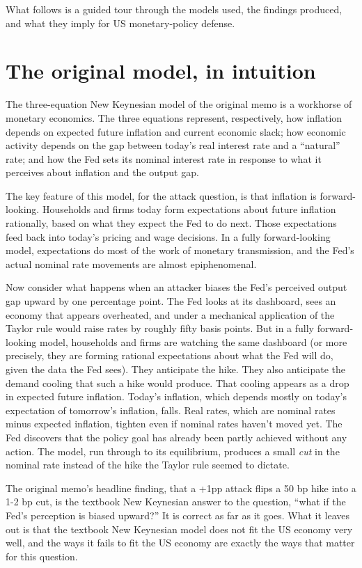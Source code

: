 \documentclass[12pt]{article}
\begin{document}
What follows is a guided tour through the models used, the findings produced, and what they imply for US monetary-policy defense.

\section{The original model, in intuition}

The three-equation New Keynesian model of the original memo is a workhorse of monetary economics. The three equations represent, respectively, how inflation depends on expected future inflation and current economic slack; how economic activity depends on the gap between today's real interest rate and a ``natural'' rate; and how the Fed sets its nominal interest rate in response to what it perceives about inflation and the output gap.

The key feature of this model, for the attack question, is that inflation is forward-looking. Households and firms today form expectations about future inflation rationally, based on what they expect the Fed to do next. Those expectations feed back into today's pricing and wage decisions. In a fully forward-looking model, expectations do most of the work of monetary transmission, and the Fed's actual nominal rate movements are almost epiphenomenal.

Now consider what happens when an attacker biases the Fed's perceived output gap upward by one percentage point. The Fed looks at its dashboard, sees an economy that appears overheated, and under a mechanical application of the Taylor rule would raise rates by roughly fifty basis points. But in a fully forward-looking model, households and firms are watching the same dashboard (or more precisely, they are forming rational expectations about what the Fed will do, given the data the Fed sees). They anticipate the hike. They also anticipate the demand cooling that such a hike would produce. That cooling appears as a drop in expected future inflation. Today's inflation, which depends mostly on today's expectation of tomorrow's inflation, falls. Real rates, which are nominal rates minus expected inflation, tighten even if nominal rates haven't moved yet. The Fed discovers that the policy goal has already been partly achieved without any action. The model, run through to its equilibrium, produces a small \emph{cut} in the nominal rate instead of the hike the Taylor rule seemed to dictate.

The original memo's headline finding, that a +1pp attack flips a 50 bp hike into a 1-2 bp cut, is the textbook New Keynesian answer to the question, ``what if the Fed's perception is biased upward?'' It is correct as far as it goes. What it leaves out is that the textbook New Keynesian model does not fit the US economy very well, and the ways it fails to fit the US economy are exactly the ways that matter for this question.
\end{document}
